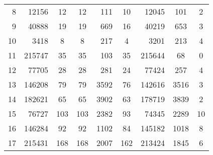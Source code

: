 \begin{table}[t]
{\begin{tabular}{r|rccr|crcc}
8  & 12156                       & 12                       & 12    & 111                       & 10                                   & 12045                              & 101                                 & 2                                   \\
9  & 40888                       & 19                       & 19    & 669                       & 16                                   & 40219                              & 653                                 & 3                                   \\
10 & 3418                        & 8                        & 8     & 217                       & 4                                    & 3201                               & 213                                 & 4                                   \\
11 & 215747                      & 35                       & 35    & 103                       & 35                                   & 215644                             & 68                                  & 0                                   \\
12 & 77705                       & 28                       & 28    & 281                       & 24                                   & 77424                              & 257                                 & 4                                   \\
13 & 146208                      & 79                       & 79    & 3592                      & 76                                   & 142616                             & 3516                                & 3                                   \\
14 & 182621                      & 65                       & 65    & 3902                      & 63                                   & 178719                             & 3839                                & 2                                   \\ \hline
15 & 76727                       & 103                      & 103   & 2382                      & 93                                  & 74345                              & 2289                                & 10                                  \\
16 & 146284                      & 92                       & 92    & 1102                      & 84                                   & 145182                             & 1018                                & 8                                   \\
17 & 215431                      & 168                      & 168   & 2007                      & 162                                  & 213424                             & 1845                                & 6                                   \\ \hline
\end{tabular}
}
\vspace{-0.4cm}
\end{table}


